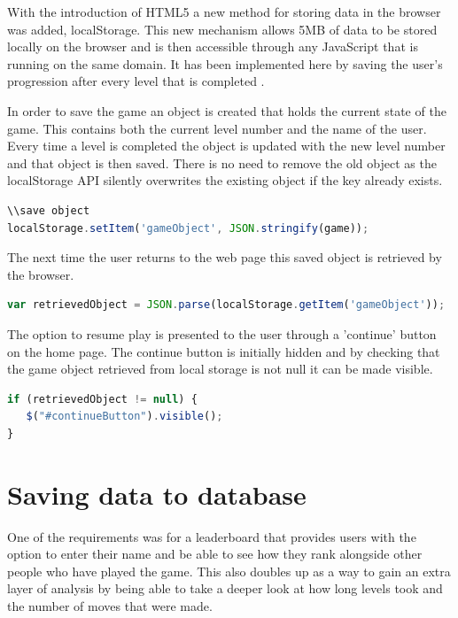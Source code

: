 \documentclass[12pt,a4paper]{report}
\begin{document}
With the introduction of HTML5 a new method for storing data in the browser was added, localStorage. This new mechanism allows 5MB of data to be stored locally on the browser and is then accessible through any JavaScript that is running on the same domain. It has been implemented here by saving the user's progression after every level that is completed \citep{mills_2017}.

In order to save the game an object is created that holds the current state of the game. This contains both the current level number and the name of the user. Every time a level is completed the object is updated with the new level number and that object is then saved. There is no need to remove the old object as the localStorage API silently overwrites the existing object if the key already exists.

\begin{minipage}{\linewidth}
\begin{lstlisting}[language=JavaScript]
\\save object
localStorage.setItem('gameObject', JSON.stringify(game));
\end{lstlisting}
\end{minipage}

The next time the user returns to the web page this saved object is retrieved by the browser.

\begin{minipage}{\linewidth}
\begin{lstlisting}[language=JavaScript]
var retrievedObject = JSON.parse(localStorage.getItem('gameObject'));
\end{lstlisting}
\end{minipage}

The option to resume play is presented to the user through a 'continue' button on the home page. The continue button is initially hidden and by checking that the game object retrieved from local storage is not null it can be made visible.

\begin{minipage}{\linewidth}
\begin{lstlisting}[language=JavaScript]
if (retrievedObject != null) {
   $("#continueButton").visible();
}
\end{lstlisting}
\end{minipage}

\section{Saving data to database}
One of the requirements was for a leaderboard that provides users with the option to enter their name and be able to see how they rank alongside other people who have played the game. This also doubles up as a way to gain an extra layer of analysis by being able to take a deeper look at how long levels took and the number of moves that were made. 
\end{document}
